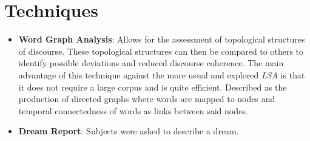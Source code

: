 \documentclass{Paper_Summary}
\begin{document}
\section{Techniques}
    \begin{itemize}
        \item \textbf{Word Graph Analysis}: Allows for the assessment of topological structures of discourse. These topological structures can then be compared to others to identify possible deviations and reduced discourse coherence. The main advantage of this technique against the more usual and explored \emph{LSA} is that it does not require a large corpus and is quite efficient. Described as the production of directed graphs where words are mapped to nodes and temporal connectedness of words as links between said nodes.
        \item \textbf{Dream Report}: Subjects were asked to describe a dream.
    
    \end{itemize}
\end{document}
